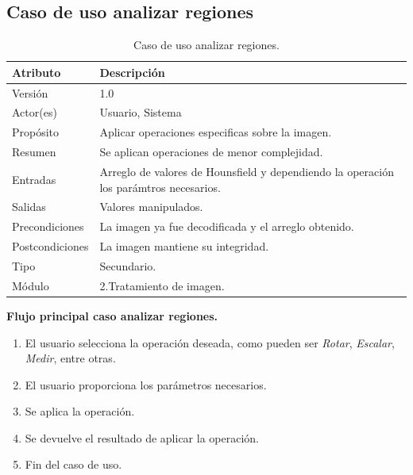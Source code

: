 \documentclass[12pt]{report}
\begin{document}
\subsection{Caso de uso analizar regiones}
\begin{table}[H]
\begin{center}
\begin{tabular}{|p{25mm}|p{60mm}|}
\hline
Atributo & Descripción\\
\hline \hline 
Versión & 1.0\\
\hline
Actor(es) & Usuario, Sistema\\
\hline
Propósito & Aplicar operaciones especificas sobre la imagen.\\
\hline
Resumen & Se aplican operaciones de menor complejidad.\\
\hline
Entradas & Arreglo de valores de Hounsfield y dependiendo la operación los parámtros necesarios.\\
\hline
Salidas & Valores manipulados.\\
\hline
Precondiciones & La imagen ya fue decodificada y el arreglo obtenido.\\
\hline
Postcondiciones & La imagen mantiene su integridad.\\
\hline
Tipo & Secundario.\\
\hline 
Módulo & 2.Tratamiento de imagen.\\
\hline
\end{tabular}
\caption{Caso de uso analizar regiones.}
\end{center}
\end{table}

\textbf{Flujo principal caso analizar regiones. }
\begin{enumerate}
\item El usuario selecciona la operación deseada, como pueden ser \textit{Rotar}, \textit{Escalar}, \textit{Medir}, entre otras.
\item El usuario proporciona los parámetros necesarios.
\item Se aplica la operación.
\item Se devuelve el resultado de aplicar la operación.
\item Fin del caso de uso.
\end{enumerate}
\end{document}
